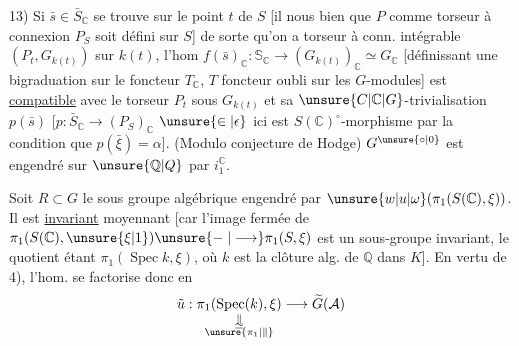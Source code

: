 13) Si $\bar s\in\bar S_{\mathbb C}$ se trouve sur le point $t$ de $S$ [il nous  bien que $P$ comme torseur à connexion  $P_S$ soit défini sur $S$] de sorte qu'on a torseur à conn. intégrable  $(P_t,G_{k(t)})$ sur $k(t)$,  l'hom $f(\bar s)_{\mathbb C}:\mathbb S_{\mathbb C}\longrightarrow(G_{k(t)})_{\mathbb C}\simeq G_{\mathbb C}$ [définissant une bigraduation sur le foncteur $T_{\mathbb C}$, $T$ foncteur oubli sur les $G$-modules] est \uline{compatible} avec le torseur $P_t$ sous $G_{k(t)}$ et sa $\unsure{C|\mathbb C|G}$-trivialisation $p(\bar s)$ [$p:\bar S_{\mathbb C}\longrightarrow(P_S)_{\mathbb C}$ $\unsure{\in|\epsilon}$ ici est  $S(\mathbb C)^{\circ}$-morphisme  par la condition que $p(\bar\xi)=\alpha$].
 (Modulo conjecture de Hodge) $G^{\unsure{\circ|0}}$ est engendré sur $\unsure{\mathbb Q|Q}$ par $i_1^{\mathbb C}$.


Soit $R\subset G$ le sous groupe algébrique engendré par $\unsure{w|u|\omega}(\pi_1(S(\mathbb C),\xi))$. Il est \uline{invariant} moyennant  [car l'image fermée de $\pi_1(S(\mathbb C),\unsure{\xi|1})\unsure{\relbar|\longrightarrow}\pi_1(S,\xi)$\unsure{\}|,} est un sous-groupe invariant\unsure{\}|,}, le quotient étant $\pi_1(\operatorname{Spec} k,\xi)$, où $k$ est la clôture alg. de $\mathbb Q$ dans $K$].  En vertu de 4), l'hom.
se factorise donc en
\[
\tilde u:\underset{\substack{\Vert\\[-.4ex]\simeq\\[-.4ex]\unsure{\pi_1|\Vert}}}{\pi_1(\operatorname{Spec}(k),\xi)}
\longrightarrow\widetilde G(\mathcal A)
\]

